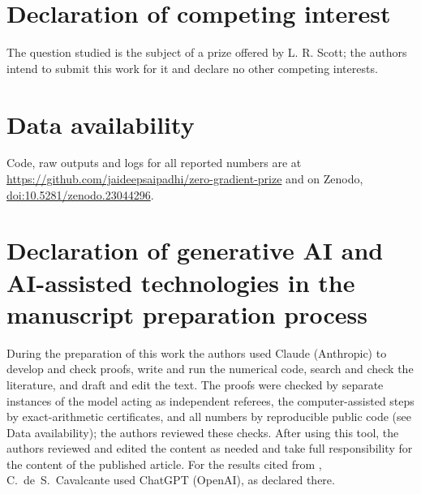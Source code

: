 \documentclass[5p,times]{elsarticle}
\theoremstyle{definition}
\begin{document}
\section*{Declaration of competing interest}
The question studied is the subject of a prize offered by L. R. Scott; the authors intend to submit this work for it and declare no other competing interests.

\section*{Data availability}
{\sloppy Code, raw outputs and logs for all reported numbers are at \url{https://github.com/jaideepsaipadhi/zero-gradient-prize} and on Zenodo, \href{https://doi.org/10.5281/zenodo.23044296}{doi:10.5281/zenodo.23044296}.\par}

\section*{Declaration of generative AI and AI-assisted technologies in the manuscript preparation process}
During the preparation of this work the authors used Claude (Anthropic) to develop and check proofs, write and run the numerical code, search and check the literature, and draft and edit the text. The proofs were checked by separate instances of the model acting as independent referees, the computer-assisted steps by exact-arithmetic certificates, and all numbers by reproducible public code (see Data availability); the authors reviewed these checks. After using this tool, the authors reviewed and edited the content as needed and take full responsibility for the content of the published article. For the results cited from \cite{Cavalcante2026}, C.~de~S.~Cavalcante used ChatGPT (OpenAI), as declared there.



\end{document}
